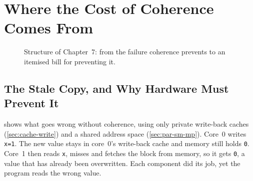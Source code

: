 \chapter{Where the Cost of Coherence Comes From}
\label{ch:origin}

\begin{figure}[htbp]
\centering
{}
\caption[]{Structure of Chapter~7: from the failure
coherence prevents to an itemised bill for preventing it.}
\label{fig:ch7-map}
\end{figure}

\section{The Stale Copy, and Why Hardware Must Prevent It}
\label{sec:orig-stale}
\label{sec:orig-hardware}
%

 shows what goes wrong without coherence, using only private
write-back caches (\cref{sec:cache-write}) and a shared address space
(\cref{sec:par-sm-mp}). Core~0 writes \texttt{x=1}. The new value stays in core~0's
write-back cache and memory still holds \texttt{0}. Core~1 then reads \texttt{x},
misses and fetches the block from memory, so it gets \texttt{0}, a value that has
already been overwritten. Each component did its job, yet the program reads the
wrong value.

